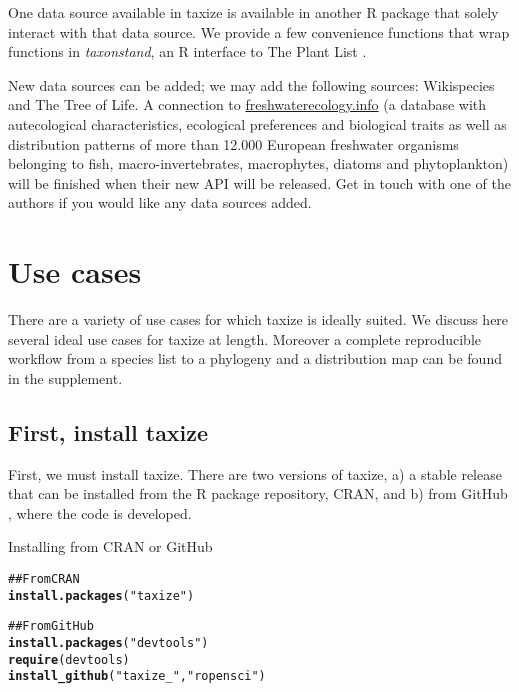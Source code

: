 \documentclass[10pt]{article}\usepackage{graphicx, color}
\makeatletter
\newcommand{\hlfunctioncall}[1]{\textcolor[rgb]{0.501960784313725,0,0.329411764705882}{\textbf{#1}}}%
\newcommand{\hlstring}[1]{\textcolor[rgb]{0.6,0.6,1}{#1}}%
\newcommand{\hlcomment}[1]{\textcolor[rgb]{0.180392156862745,0.6,0.341176470588235}{#1}}%
\newenvironment{kframe}{%
 \def\at@end@of@kframe{}%
 \ifinner\ifhmode%
  \def\at@end@of@kframe{\end{minipage}}%
  \begin{minipage}{\columnwidth}%
 \fi\fi%
 \def\FrameCommand##1{\hskip\@totalleftmargin \hskip-\fboxsep
 \colorbox{shadecolor}{##1}\hskip-\fboxsep
     \hskip-\linewidth \hskip-\@totalleftmargin \hskip\columnwidth}%
 \MakeFramed {\advance\hsize-\width
   \@totalleftmargin\z@ \linewidth\hsize
   \@setminipage}}%
 {\par\unskip\endMakeFramed%
 \at@end@of@kframe}
\newenvironment{knitrout}{}{} %
\makeatother
\begin{document}
One data source available in taxize is available in another R package that solely interact with that data source. We provide a few convenience functions that wrap functions in \emph{taxonstand}, an R interface to The Plant List \cite{theplantlist}. 

New data sources can be added; we may add the following sources: Wikispecies and The Tree of Life. A connection to \url{freshwaterecology.info} \cite{freshwaterecology} (a database with autecological characteristics, ecological preferences and biological traits as well as distribution patterns of more than 12.000 European freshwater organisms belonging to fish, macro-invertebrates, macrophytes, diatoms and phytoplankton) will be finished when their new API will be released. Get in touch with one of the authors if you would like any data sources added.

\section*{Use cases}

There are a variety of use cases for which taxize is ideally suited. We discuss here several ideal use cases for taxize at length. Moreover a complete reproducible workflow from a species list to a phylogeny and a distribution map can be found in the supplement.

\subsection*{First, install taxize}

First, we must install taxize. There are two versions of taxize, a) a stable release that can be installed from the R package repository, CRAN, and b) from GitHub \cite{github_taxize}, where the code is developed.

Installing from CRAN or GitHub

\begin{knitrout}
\color{fgcolor}\begin{kframe}
\begin{alltt}
\hlcomment{## From CRAN}
\hlfunctioncall{install.packages}(\hlstring{"taxize"})

\hlcomment{## From GitHub}
\hlfunctioncall{install.packages}(\hlstring{"devtools"})
\hlfunctioncall{require}(devtools)
\hlfunctioncall{install_github}(\hlstring{"taxize_"}, \hlstring{"ropensci"})
\end{alltt}
\end{kframe}
\end{knitrout}
\end{document}
